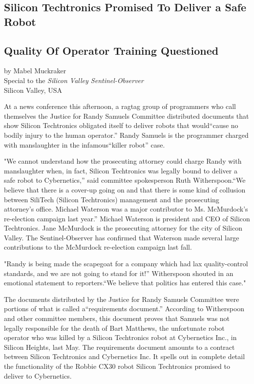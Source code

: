 \begin{center}
\section*{Silicon Techtronics Promised To Deliver a Safe Robot}
\subsection*{Quality Of Operator Training Questioned}
by Mabel Muckraker\\
Special to the \textit{Silicon Valley Sentinel-Observer}\\
Silicon Valley, USA
\end{center}

At a news conference this afternoon, a ragtag group of programmers who call themselves the Justice for Randy Samuels Committee distributed documents that show Silicon Techtronics obligated itself to deliver robots that would``cause no bodily injury to the human operator.'' Randy Samuels is the programmer charged with manslaughter in the infamous``killer robot'' case.

"We cannot understand how the prosecuting attorney could charge Randy with manslaughter when, in fact, Silicon Techtronics was legally bound to deliver a safe robot to Cybernetics,'' said committee spokesperson Ruth Witherspoon.``We believe that there is a cover-up going on and that there is some kind of collusion between SiliTech (Silicon Techtronics) management and the prosecuting attorney's office. Michael Waterson was a major contributor to Ms. McMurdock's re-election campaign last year.'' Michael Waterson is president and CEO of Silicon Techtronics. Jane McMurdock is the prosecuting attorney for the city of Silicon Valley. The Sentinel-Observer has confirmed that Waterson made several large contributions to the McMurdock re-election campaign last fall.

"Randy is being made the scapegoat for a company which had lax quality-control standards, and we are not going to stand for it!'' Witherspoon shouted in an emotional statement to reporters.``We believe that politics has entered this case."

The documents distributed by the Justice for Randy Samuels Committee were portions of what is called a``requirements document.'' According to Witherspoon and other committee members, this document proves that Samuels was not legally responsible for the death of Bart Matthews, the unfortunate robot operator who was killed by a Silicon Techtronics robot at Cybernetics Inc., in Silicon Heights, last May. The requirements document amounts to a contract between Silicon Techtronics and Cybernetics Inc. It spells out in complete detail the functionality of the Robbie CX30 robot Silicon Techtronics promised to deliver to Cybernetics.

